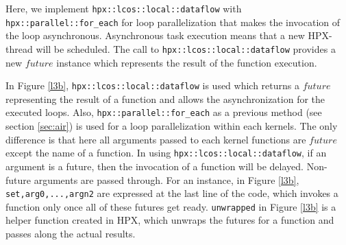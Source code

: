 \documentclass[conference]{IEEEtran}
\begin{document}
Here, we implement \texttt{hpx::lcos::local::dataflow} with \texttt{hpx::parallel::for\_each} for loop parallelization that makes the invocation of the loop asynchronous. Asynchronous task execution means that a new HPX-thread will be scheduled. The call to \texttt{hpx::lcos::local::dataflow} provides a new $future$ instance which represents the result of the function execution.  

In Figure \ref{l3b}, \texttt{hpx::lcos::local::dataflow} is used which returns a $future$ representing the result of a function and allows the asynchronization for the executed loops. Also, \texttt{hpx::parallel::for\_each} as a previous method (see section \ref{sec:air}) is used for a loop parallelization within each kernels. The only difference is that here all arguments passed to each kernel functions are $future$ except the name of a function. In using \texttt{hpx::lcos::local::dataflow}, if an argument is a future, then the invocation of a function will be delayed. Non-future arguments are passed through. For an instance, in Figure \ref{l3b}, \texttt{set,arg0,...,argn2} are expressed at the last line of the code, which invokes a function only once all of these futures get ready. \texttt{unwrapped} in Figure \ref{l3b} is a helper function created in HPX, which  unwraps the futures for a function and  passes along the actual results. 
\end{document}
